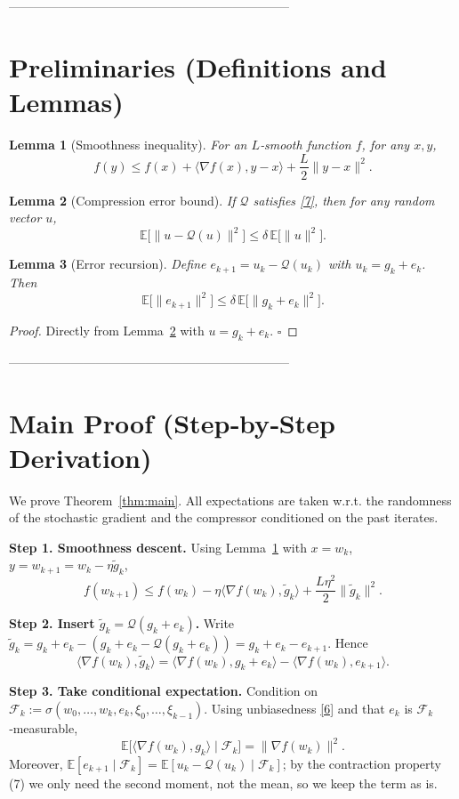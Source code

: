 \documentclass{article}
\newtheorem{lemma}{Lemma}
\begin{document}
--------------------------------------------------------------------

\section*{Preliminaries (Definitions and Lemmas)}
\begin{lemma}[Smoothness inequality]\label{lem:smooth}
For an $L$‑smooth function $f$, for any $x,y$,
\[
f(y)\le f(x)+\langle\nabla f(x),y-x\rangle+\frac{L}{2}\|y-x\|^2 .
\tag{L1}
\]
\end{lemma}
\begin{lemma}[Compression error bound]\label{lem:compress}
If $\mathcal{Q}$ satisfies \eqref{7}, then for any random vector $u$,
\[
\mathbb{E}\!\big[\|u-\mathcal{Q}(u)\|^2\big]\le\delta\,\mathbb{E}\!\big[\|u\|^2\big].
\tag{L2}
\]
\end{lemma}
\begin{lemma}[Error recursion]\label{lem:error}
Define $e_{k+1}=u_k-\mathcal{Q}(u_k)$ with $u_k=g_k+e_k$. Then
\[
\mathbb{E}\!\big[\|e_{k+1}\|^2\big]\le\delta\,\mathbb{E}\!\big[\|g_k+e_k\|^2\big].
\tag{L3}
\]
\end{lemma}
\begin{proof}
Directly from Lemma~\ref{lem:compress} with $u=g_k+e_k$. $\square$
\end{proof}
--------------------------------------------------------------------

\section*{Main Proof (Step‑by‑Step Derivation)}
We prove Theorem~\ref{thm:main}.  
All expectations are taken w.r.t. the randomness of the stochastic gradient and the compressor conditioned on the past iterates.

\noindent\textbf{Step 1. Smoothness descent.}  
Using Lemma~\ref{lem:smooth} with $x=w_k$, $y=w_{k+1}=w_k-\eta\tilde g_k$,
\[
f(w_{k+1})\le f(w_k)-\eta\langle\nabla f(w_k),\tilde g_k\rangle
+\frac{L\eta^2}{2}\|\tilde g_k\|^2 .
\tag{S1}
\]

\noindent\textbf{Step 2. Insert $\tilde g_k=\mathcal{Q}(g_k+e_k)$.}  
Write $\tilde g_k = g_k+e_k-(g_k+e_k-\mathcal{Q}(g_k+e_k)) = g_k+e_k-e_{k+1}$. Hence
\[
\langle\nabla f(w_k),\tilde g_k\rangle
= \langle\nabla f(w_k),g_k+e_k\rangle-\langle\nabla f(w_k),e_{k+1}\rangle .
\tag{S2}
\]

\noindent\textbf{Step 3. Take conditional expectation.}  
Condition on $\mathcal{F}_k:=\sigma(w_0,\dots,w_k,e_k,\xi_0,\dots,\xi_{k-1})$.
Using unbiasedness \eqref{6} and that $e_k$ is $\mathcal{F}_k$‑measurable,
\[
\mathbb{E}\!\big[\langle\nabla f(w_k),g_k\rangle\mid\mathcal{F}_k\big]
= \|\nabla f(w_k)\|^2 .
\tag{S3}
\]
Moreover, $\mathbb{E}[e_{k+1}\mid\mathcal{F}_k]=\mathbb{E}[u_k-\mathcal{Q}(u_k)\mid\mathcal{F}_k]$; by the contraction property (7) we only need the second moment, not the mean, so we keep the term as is.
\end{document}
